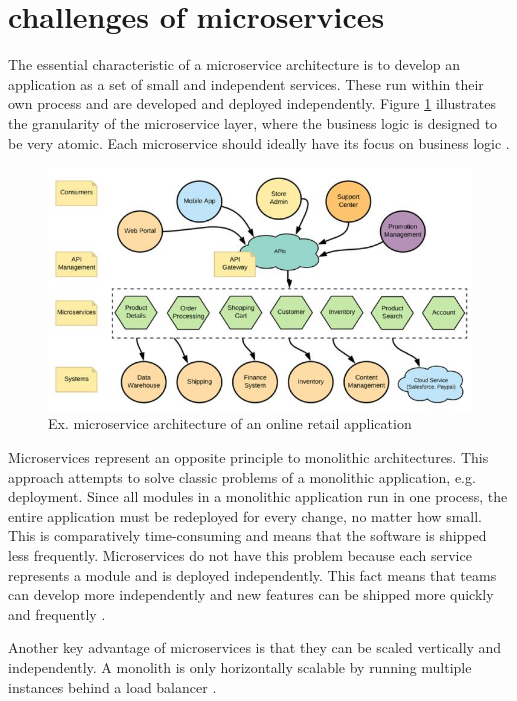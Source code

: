 \section{challenges of microservices}

The essential characteristic of a microservice architecture is to develop an application as a set of small and independent services. These run within their own process and are developed and deployed independently. Figure \ref{fig:microservice} illustrates the granularity of the microservice layer, where the business logic is designed to be very atomic. Each microservice should ideally have its focus on business logic \cite[p. 7]{sm3}.

\begin{figure}
    \includegraphics[width=\columnwidth]{img/microservice.JPG}
    \caption{Ex. microservice architecture of an online retail application \cite[p. 7]{sm3}}
    \label{fig:microservice}
\end{figure}

Microservices represent an opposite principle to monolithic architectures. This approach attempts to solve classic problems of a monolithic application, e.g. deployment. Since all modules in a monolithic application run in one process, the entire application must be redeployed for every change, no matter how small. This is comparatively time-consuming and means that the software is shipped less frequently. Microservices do not have this problem because each service represents a module and is deployed independently. This fact means that teams can develop more independently and new features can be shipped more quickly and frequently \cite{fowler}.

Another key advantage of microservices is that they can be scaled vertically and independently. A monolith is only horizontally scalable by running multiple instances behind a load balancer \cite{fowler}.

